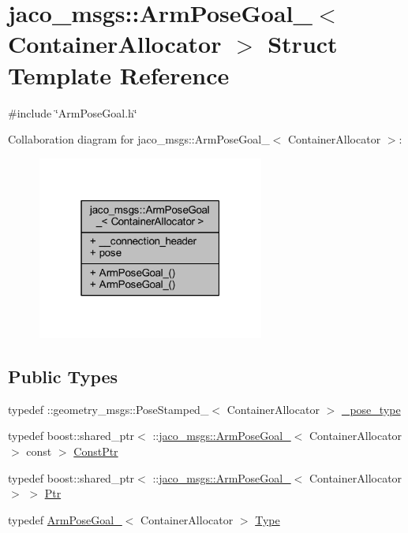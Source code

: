 \hypertarget{structjaco__msgs_1_1ArmPoseGoal__}{}\section{jaco\+\_\+msgs\+:\+:Arm\+Pose\+Goal\+\_\+$<$ Container\+Allocator $>$ Struct Template Reference}
\label{structjaco__msgs_1_1ArmPoseGoal__}


{\ttfamily \#include \char`\"{}Arm\+Pose\+Goal.\+h\char`\"{}}



Collaboration diagram for jaco\+\_\+msgs\+:\+:Arm\+Pose\+Goal\+\_\+$<$ Container\+Allocator $>$\+:
\nopagebreak
\begin{figure}[H]
\begin{center}
\leavevmode
\includegraphics[width=211pt]{d3/dc7/structjaco__msgs_1_1ArmPoseGoal____coll__graph}
\end{center}
\end{figure}
\subsection*{Public Types}
\begin{DoxyCompactItemize}
\item 
typedef \+::geometry\+\_\+msgs\+::\+Pose\+Stamped\+\_\+$<$ Container\+Allocator $>$ \hyperlink{structjaco__msgs_1_1ArmPoseGoal___a000eb0e79cdb7de7c51bac91709ffae0}{\+\_\+pose\+\_\+type}
\item 
typedef boost\+::shared\+\_\+ptr$<$ \+::\hyperlink{structjaco__msgs_1_1ArmPoseGoal__}{jaco\+\_\+msgs\+::\+Arm\+Pose\+Goal\+\_\+}$<$ Container\+Allocator $>$ const  $>$ \hyperlink{structjaco__msgs_1_1ArmPoseGoal___a54d5a329b1a740ee3922d9b43646d1ba}{Const\+Ptr}
\item 
typedef boost\+::shared\+\_\+ptr$<$ \+::\hyperlink{structjaco__msgs_1_1ArmPoseGoal__}{jaco\+\_\+msgs\+::\+Arm\+Pose\+Goal\+\_\+}$<$ Container\+Allocator $>$ $>$ \hyperlink{structjaco__msgs_1_1ArmPoseGoal___ad71d8fe47f303b9e2b8c0e8025424521}{Ptr}
\item 
typedef \hyperlink{structjaco__msgs_1_1ArmPoseGoal__}{Arm\+Pose\+Goal\+\_\+}$<$ Container\+Allocator $>$ \hyperlink{structjaco__msgs_1_1ArmPoseGoal___a3eb2f7692263577184c3ae57546c0ca4}{Type}
\end{DoxyCompactItemize}
